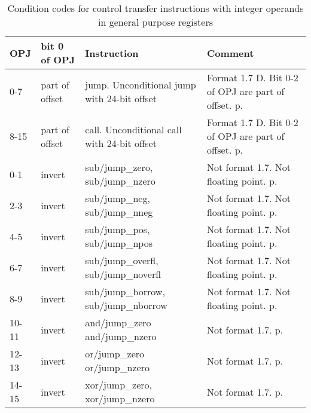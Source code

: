 \documentclass[forwardcom.tex]{subfiles}
\begin{document}
\begin{longtable}
{|p{12mm}|p{16mm}|p{60mm}|p{55mm}|}
\caption{Condition codes for control transfer instructions with integer operands in general purpose registers }
\label{table:controlTransferInstructions}
\endfirsthead
\endhead
\hline
\bfseries OPJ & \bfseries bit 0 \newline of OPJ & \bfseries Instruction & \bfseries Comment \\
\hline
0-7 & part of offset & jump. Unconditional jump with 24-bit offset & Format 1.7 D. Bit 0-2 of OPJ are part of offset.  p. \pageref{table:jumpInstruction} \\
\hline
8-15 & part of offset & call. Unconditional call with 24-bit offset & Format 1.7 D.  Bit 0-2 of OPJ are part of offset. p. \pageref{table:callInstruction} \\
\hline
0-1 & invert & sub/jump\_zero, \newline sub/jump\_nzero & Not format 1.7. Not floating point. p. \pageref{table:subJumpZeroInstruction} \\
\hline
2-3 & invert & sub/jump\_neg, \newline sub/jump\_nneg & Not format 1.7. Not floating point. p. \pageref{table:subJumpNegInstruction}  \\
\hline
4-5 & invert & sub/jump\_pos, \newline sub/jump\_npos & Not format 1.7. Not floating point. p. \pageref{table:subJumpPosInstruction} \\
\hline
6-7 & invert & sub/jump\_overfl, \newline sub/jump\_noverfl & Not format 1.7. Not floating point. p. \pageref{table:subJumpOverflInstruction} \\
\hline
8-9 & invert & sub/jump\_borrow, \newline sub/jump\_nborrow & Not format 1.7. Not floating point. p. \pageref{table:subJumpBorrowInstruction} \\
\hline
10-11 & invert & and/jump\_zero \newline and/jump\_nzero & Not format 1.7. p. \pageref{table:andJumpZeroInstruction} \\
\hline
12-13 & invert & or/jump\_zero \newline or/jump\_nzero & Not format 1.7. p. \pageref{table:orJumpZeroInstruction} \\
\hline
14-15 & invert & xor/jump\_zero, \newline xor/jump\_nzero & Not format 1.7. p. \pageref{table:xorJumpZeroInstruction} \\

\end{longtable}
\end{document}
